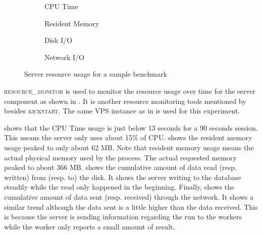 \begin{figure}
	\centering

	\begin{subfigure}{.45\textwidth}
		\centering
		\caption{CPU Time}
		\label{fig:eval.perf.cpu}
	\end{subfigure}%
	\hfill%
	\begin{subfigure}{.45\textwidth}
		\centering
		\caption{Resident Memory}
		\label{fig:eval.perf.rss}
	\end{subfigure}

	\vspace{1cm}

	\begin{subfigure}{.45\textwidth}
		\centering
		\caption{Disk I/O}
		\label{fig:eval.perf.disk}
	\end{subfigure}%
	\hfill%
	\begin{subfigure}{.45\textwidth}
		\centering
		\caption{Network I/O}
		\label{fig:eval.perf.network}
	\end{subfigure}

	\caption{Server resource usage for a sample benchmark}
	\label{fig:eval.perf}
\end{figure}

\textsc{resource\_monitor} \citep{ResourceMonitorCooperative} is used to monitor the resource usage over time for the server component as shown in .
It is another resource monitoring tools mentioned by \citet{juvePracticalResourceMonitoring2015} besides \textsc{kickstart}.
The same VPS instance as in  is used for this experiment.

 shows that the CPU Time usage is just below 13 seconds for a 90 seconds session.
This means the server only uses about 15\% of CPU.
 shows the resident memory usage peaked to only about 62 MB.
Note that resident memory usage means the actual physical memory used by the process.
The actual requested memory peaked to about 366 MB.
 shows the cumulative amount of data read (resp. written) from (resp. to) the disk.
It shows the server writing to the database steadily while the read only happened in the beginning.
Finally,  shows the cumulative amount of data sent (resp. received) through the network.
It shows a similar trend although the data sent is a little higher than the data received.
This is because the server is sending information regarding the run to the workers while the worker only reports a small amount of result.


